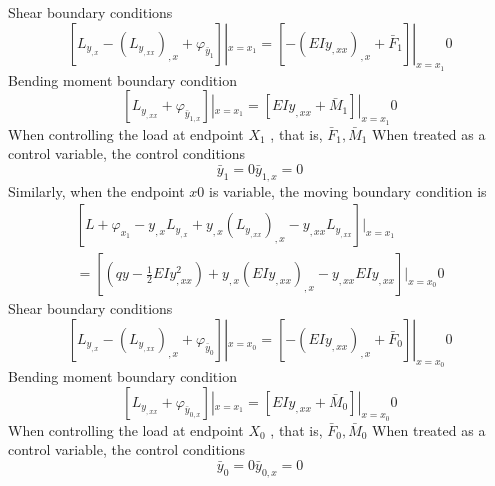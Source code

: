 Shear boundary conditions
\begin{equation} \label{eq:(zxxgyl.2.19)}    
[L_{y_{,x}}  -(L_{y_{,xx}})_{,x} + \varphi_{\bar {y}_ {1} }]|_{x=x_1}
=[-(EIy_{,xx})_{,x}+ \bar {F}_1 ]|_{x=x_1}
0
\end{equation}
Bending moment boundary condition
\begin{equation} \label{eq:(zxxgyl.2.20)}    
[L_{y_{,xx}}  +\varphi_{\bar {y}_ {1,x}}]|_{x=x_1}  =[EIy_{,xx}  +\bar {M}_1 ]|_{x=x_1}   
0
\end{equation}
When controlling the load at endpoint $ X_1$ , that is, $ \bar {F}_1 , \bar {M}_1 $ When treated as a control variable, the control conditions
\begin{subequations}\label{eq:(zxxgyl.2.21)} 
\begin{equation}    
\bar {y}_ {1}=0
\end{equation}
\begin{equation}    
\bar {y}_ {1,x}=0
\end{equation}    
\end{subequations}
Similarly, when the endpoint $ x0$ is variable, the moving boundary condition is
\begin{multline} \label{eq:(zxxgyl.2.22)}    
[L+ \varphi_{x_{1}}
-y_{,x} L_{y_{,x}}   + y_{,x} \left(L_{y_{,xx}}\right)_{,x} 
-y_{,xx} L_{y_{,xx}} 
]|_{x=x_1}
\\=[(qy-\frac{1} {2}EIy_ {,xx}^2)+y_{,x} \left(EIy_{,xx}\right)_{,x} 
-y_{,xx} EIy_{,xx}]|_{x=x_0}  
0
\end{multline}
Shear boundary conditions
\begin{equation} \label{eq:(zxxgyl.2.23)}    
[L_{y_{,x}}  -(L_{y_{,xx}})_{,x} + \varphi_{\bar {y}_ {0} }]|_{x=x_0}
=[-(EIy_{,xx})_{,x}+ \bar {F}_0 ]|_{x=x_0}
0
\end{equation}
Bending moment boundary condition
\begin{equation} \label{eq:(zxxgyl.2.24)}    
[L_{y_{,xx}}  +\varphi_{\bar {y}_ {0,x}}]|_{x=x_1}  =[EIy_{,xx}  +\bar {M}_0 ]|_{x=x_0}   
0
\end{equation}
When controlling the load at endpoint $ X_0 $ , that is, $ \bar {F}_0 , \bar {M}_0 $ When treated as a control variable, the control conditions
\begin{subequations}\label{eq:(zxxgyl.2.25)} 
\begin{equation}    
\bar {y}_ {0}=0
\end{equation}
\begin{equation}    
\bar {y}_ {0,x}=0
\end{equation}    
\end{subequations}
